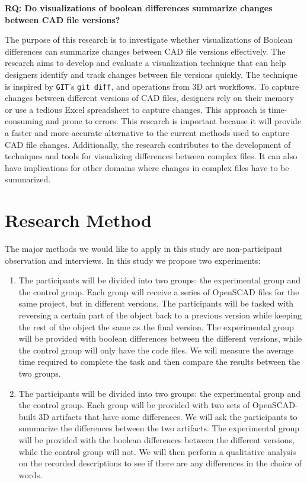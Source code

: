 \documentclass[sigconf,]{acmart}
\begin{document}
\textbf{RQ: Do visualizations of boolean differences summarize changes between CAD file versions?}

The purpose of this research is to investigate whether visualizations of Boolean differences can summarize changes between CAD file versions effectively. The research aims to develop and evaluate a visualization technique that can help designers identify and track changes between file versions quickly. The technique is inspired by \texttt{GIT}'s \texttt{git diff}, and operations from 3D art workflows. To capture changes between different versions of CAD files, designers rely on their memory or use a tedious Excel spreadsheet to capture changes. This approach is time-consuming and prone to errors. This research is important because it will provide a faster and more accurate alternative to the current methods used to capture CAD file changes. Additionally, the research contributes to the development of techniques and tools for visualizing differences between complex files. It can also have implications for other domains where changes in complex files have to be summarized.

\section{Research Method}

The major methods we would like to apply in this study are non-participant observation and interviews. In this study we propose two experiments:

\begin{enumerate}
	\item The participants will be divided into two groups: the experimental group and the control group. Each group will receive a series of OpenSCAD files for the same project, but in different versions. The participants will be tasked with reversing a certain part of the object back to a previous version while keeping the rest of the object the same as the final version. The experimental group will be provided with boolean differences between the different versions, while the control group will only have the code files. We will measure the average time required to complete the task and then compare the results between the two groups.
	\item The participants will be divided into two groups: the experimental group and the control group. Each group will be provided with two sets of OpenSCAD-built 3D artifacts that have some differences. We will ask the participants to summarize the differences between the two artifacts. The experimental group will be provided with the boolean differences between the different versions, while the control group will not. We will then perform a qualitative analysis on the recorded descriptions to see if there are any differences in the choice of words.
\end{enumerate}
\end{document}
